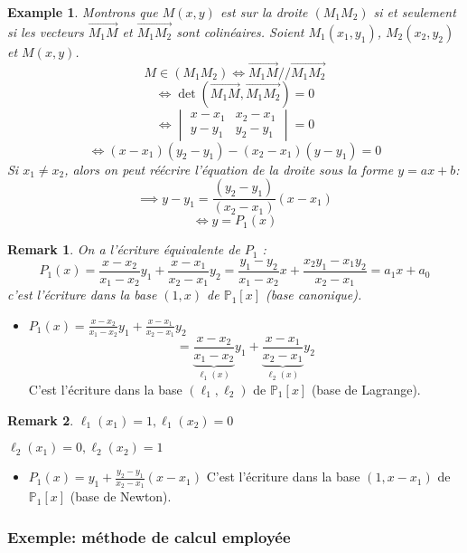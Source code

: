 \documentclass{article}
\newtheorem{remark}{Remark}
\newtheorem{example}{Example}
\begin{document}
\begin{example}
Montrons que $M(x,y)$ est sur la droite $(M_1M_2)$ si et seulement si les vecteurs $\overrightarrow{M_1M}$ et $\overrightarrow{M_1M_2}$ sont colinéaires.
Soient $M_1(x_1, y_1)$, $M_2(x_2, y_2)$ et $M(x,y)$.
\[
M \in (M_1M_2) \Leftrightarrow \overrightarrow{M_1M} // \overrightarrow{M_1M_2}
\]
\[
\Leftrightarrow \det(\overrightarrow{M_1M}, \overrightarrow{M_1M_2}) = 0
\]
\[
\Leftrightarrow \begin{vmatrix} x-x_1 & x_2-x_1 \\ y-y_1 & y_2-y_1 \end{vmatrix} = 0
\]
\[
\Leftrightarrow (x-x_1)(y_2-y_1) - (x_2-x_1)(y-y_1) = 0
\]
Si $x_1 \neq x_2$, alors on peut réécrire l'équation de la droite sous la forme $y=ax+b$:
\[
\implies y-y_1 = \frac{(y_2-y_1)}{(x_2-x_1)} (x-x_1)
\]
\[
\Leftrightarrow y = P_1(x)
\]
\end{example}

\begin{remark}
On a l'écriture équivalente de $P_1$ :
\[
P_1(x) = \frac{x-x_2}{x_1-x_2} y_1 + \frac{x-x_1}{x_2-x_1} y_2 = \frac{y_1-y_2}{x_1-x_2} x + \frac{x_2y_1-x_1y_2}{x_2-x_1} = a_1 x + a_0
\]
c'est l'écriture dans la base $(1, x)$ de $\mathbb{P}_1[x]$ (base canonique).
\end{remark}

\begin{itemize}
    \item $P_1(x) = \frac{x-x_2}{x_1-x_2} y_1 + \frac{x-x_1}{x_2-x_1} y_2$
    \[
    = \underbrace{\frac{x-x_2}{x_1-x_2}}_{\ell_1(x)} y_1 + \underbrace{\frac{x-x_1}{x_2-x_1}}_{\ell_2(x)} y_2
    \]
    C'est l'écriture dans la base $(\ell_1, \ell_2)$ de $\mathbb{P}_1[x]$ (base de Lagrange).
\end{itemize}

\begin{remark}
$\ell_1(x_1) = 1, \ell_1(x_2) = 0$

$\ell_2(x_1) = 0, \ell_2(x_2) = 1$
\end{remark}

\begin{itemize}
    \item $P_1(x) = y_1 + \frac{y_2-y_1}{x_2-x_1} (x-x_1)$
    C'est l'écriture dans la base $(1, x-x_1)$ de $\mathbb{P}_1[x]$ (base de Newton).
\end{itemize}


\subsubsection{Exemple: méthode de calcul employée}
\end{document}
